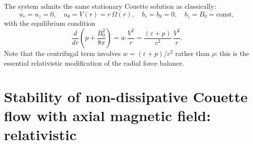 \medskip
The system admits the same stationary Couette solution as classically:
\begin{equation}
  u_{r} = u_{z} = 0,\quad u_{\theta} = V(r) = r\,\Omega(r),\quad
  b_{r} = b_{\theta} = 0,\quad b_{z} = B_{0} = \text{const},
  \label{eq:rel-9-baseflow}
\end{equation}
with the equilibrium condition
\begin{equation}
  \frac{d}{dr}\!\left(p + \frac{B_{0}^{2}}{8\pi}\right)
  = w\,\frac{V^{2}}{r}
  = \frac{(\varepsilon + p)}{c^{2}}\,\frac{V^{2}}{r}.
  \label{eq:rel-9-equil}
\end{equation}
Note that the centrifugal term involves $w = (\varepsilon+p)/c^{2}$
rather than $\rho$: this is the essential relativistic modification of
the radial force balance.

\section{Stability of non-dissipative Couette flow with axial
  magnetic field: relativistic}
\label{sec:rel-81}

